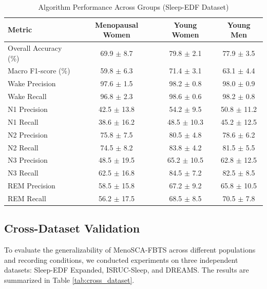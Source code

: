 \documentclass[ASNA,twocolumn]{USG}
\begin{document}
\begin{table}[!ht]
\centering
\caption{Algorithm Performance Across Groups (Sleep-EDF Dataset)}
\begin{tabular*}{\textwidth}{@{\extracolsep\fill}lccc@{\extracolsep\fill}}
\toprule
\textbf{Metric} & \textbf{Menopausal Women} & \textbf{Young Women} & \textbf{Young Men} \\
\midrule
Overall Accuracy (\%) & 69.9 $\pm$ 8.7 & 79.8 $\pm$ 2.1 & 77.9 $\pm$ 3.5 \\
Macro F1-score (\%) & 59.8 $\pm$ 6.3 & 71.4 $\pm$ 3.1 & 63.1 $\pm$ 4.4 \\
Wake Precision & 97.6 $\pm$ 1.5 & 98.2 $\pm$ 0.8 & 98.0 $\pm$ 0.9 \\
Wake Recall & 96.8 $\pm$ 2.3 & 98.6 $\pm$ 0.6 & 98.2 $\pm$ 0.8 \\
N1 Precision & 42.5 $\pm$ 13.8 & 54.2 $\pm$ 9.5 & 50.8 $\pm$ 11.2 \\
N1 Recall & 38.6 $\pm$ 16.2 & 48.5 $\pm$ 10.3 & 45.2 $\pm$ 12.5 \\
N2 Precision & 75.8 $\pm$ 7.5 & 80.5 $\pm$ 4.8 & 78.6 $\pm$ 6.2 \\
N2 Recall & 74.5 $\pm$ 8.2 & 83.8 $\pm$ 4.2 & 81.5 $\pm$ 5.5 \\
N3 Precision & 48.5 $\pm$ 19.5 & 65.2 $\pm$ 10.5 & 62.8 $\pm$ 12.5 \\
N3 Recall & 62.5 $\pm$ 16.8 & 84.5 $\pm$ 7.2 & 82.5 $\pm$ 8.5 \\
REM Precision & 58.5 $\pm$ 15.8 & 67.2 $\pm$ 9.2 & 65.8 $\pm$ 10.5 \\
REM Recall & 56.2 $\pm$ 17.5 & 68.5 $\pm$ 8.5 & 70.5 $\pm$ 7.8 \\
\bottomrule
\end{tabular*}
\label{tab:performance}
\end{table}

\subsection{Cross-Dataset Validation}

To evaluate the generalizability of MenoSCA-FBTS across different populations and recording conditions, we conducted experiments on three independent datasets: Sleep-EDF Expanded, ISRUC-Sleep, and DREAMS. The results are summarized in Table \ref{tab:cross_dataset}.
\end{document}
